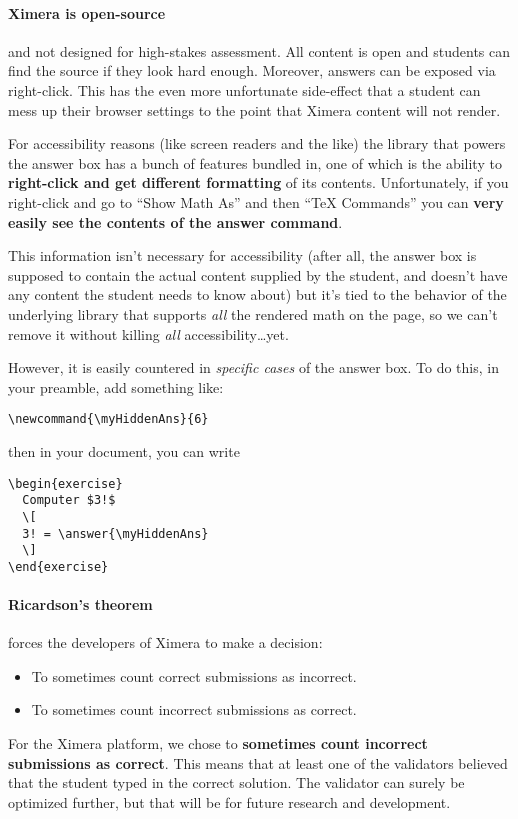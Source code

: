 \documentclass{ximera}
\begin{document}
\paragraph{Ximera is open-source} and not designed for high-stakes assessment.
All content is
open and students can find the source if they look hard enough. Moreover,
answers can be exposed via right-click. This has the even more unfortunate
side-effect that a student can mess up their browser settings to the point that
Ximera content will not render.

For accessibility reasons (like screen readers and the like) the library
that powers the answer box has a bunch of features bundled in, one of which is
the ability to \textbf{right-click and get different formatting} of its
contents.
Unfortunately, if you right-click and go to ``Show Math As'' and then ``TeX
Commands'' you can \textbf{very easily see the contents of the answer command}.

This information isn't necessary for accessibility
(after all, the answer box is supposed to contain the actual content supplied by
the student, and doesn't have any content the student needs to know about) but
it's tied to the behavior of the underlying library that supports \textit{all}
the rendered math on the page, so we can't remove it without killing
\textit{all} accessibility\dots yet.

However, it is easily countered in \textit{specific cases} of the answer box.
To do this, in your preamble, add something like:
\begin{verbatim}
\newcommand{\myHiddenAns}{6}
\end{verbatim}
then in your document, you can write
\begin{verbatim}
\begin{exercise}
  Computer $3!$
  \[
  3! = \answer{\myHiddenAns}
  \]  
\end{exercise}
\end{verbatim}

\paragraph{Ricardson's theorem} forces the developers of Ximera to make a
decision:
\begin{itemize}
  \item To sometimes count correct submissions as incorrect.
  \item To sometimes count incorrect submissions as correct.
\end{itemize}
For the Ximera platform, we chose to \textbf{sometimes count incorrect
  submissions as correct}. This means that at least one of the validators
believed that the student typed in the correct solution. The validator can
surely be optimized further, but that will be for future research and
development.
\end{document}
